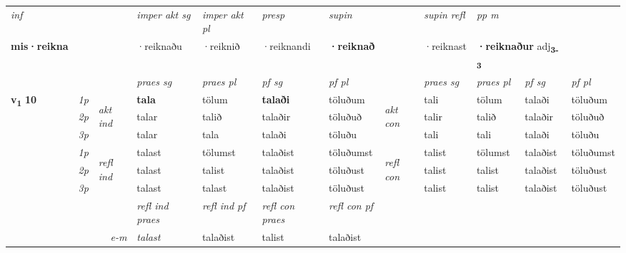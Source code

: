 \begin{longtable}[l]{X>{\footnotesize\itshape}llXXXXlXXXX}
\cmidrule{4-7}
   {\textit{inf}} & &  & \textit{imper akt sg} & \textit{imper akt pl}   & \textit{presp} & \textit{supin} && \textit{supin refl} & \textit{pp m} \\*
  {\textbf{mis\allowbreak ·reikna}} & && ·reiknaðu  & ·reiknið   & ·reiknandi &  \textbf{·reiknað} && ·reiknast & \multicolumn{2}{l}{\textbf{·reiknaður} adj\textbf{\textsubscript{3-3}}} \\*

\midrule

 & &   & \textit{praes sg}  & \textit{praes pl}    & \textit{ pf sg} & \textit{pf pl} & & \textit{praes sg}  & \textit{praes pl}    & \textit{pf sg} & \textit{pf pl }  \\ \cmidrule{4-7} \cmidrule{9-12}
 \multirow{2}{*}{{{\textbf{v{\textsubscript{1}}} \Large{\textbf{10}}}}}  & 1p & \multirow{3}{*}{\begin{turn}{90}\textit{akt ind}\end{turn}} & \textbf{tala} & tölum & \textbf{talaði} & töluðum & \multirow{3}{*}{\begin{turn}{90}\textit{akt con}\end{turn}} &tali & tölum & talaði & töluðum\\*
 & 2p &  &  talar  & talið & talaðir & töluðuð & & talir & talið & talaðir & töluðuð \\*
 & 3p &  & talar & tala & talaði & töluðu & & tali & tali& talaði & töluðu \\*
\cmidrule{4-7} \cmidrule{9-12}
 & 1p & \multirow{3}{*}{\begin{turn}{90}\textit{refl ind}\end{turn}}  & talast & tölumst & talaðist & töluðumst & \multirow{3}{*}{\begin{turn}{90}\textit{refl con}\end{turn}}  &talist & tölumst & talaðist & töluðumst \\*
 & 2p &  & talast & talist & talaðist & töluðust & &talist & talist & talaðist & töluðust \\*
 & 3p  & & talast & talast & talaðist & töluðust & & talist & talist& talaðist & töluðust \\*
\cmidrule{4-7} \cmidrule{9-12}

 & && \textit{refl ind praes} & \textit{refl ind pf} & \textit{refl con praes} & \textit{refl con pf} \\*
\multicolumn{3}{r}{\textit{e-m}}& talast & talaðist & talist & talaðist \\*


\end{longtable}
